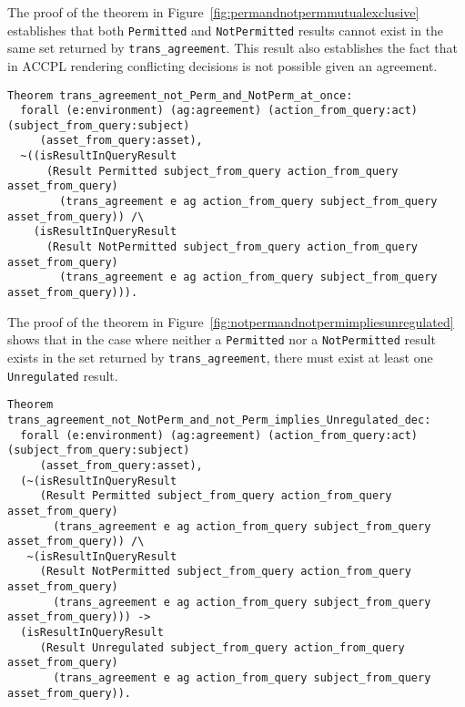 \documentclass[conference]{IEEEtran}
\newcommand{\syn}{\texttt}
\begin{document}
The proof of the theorem in
Figure~\ref{fig:permandnotpermmutualexclusive} establishes that both
\syn{Permitted} and \syn{NotPermitted} results cannot exist in the
same set returned by \syn{trans_agreement}. This result also
establishes the fact that in \ac{ACCPL} rendering conflicting
decisions is not possible given an agreement.

\lstset{language=Coq, captionpos=b}
\begin{figure*}
\begin{lstlisting}
Theorem trans_agreement_not_Perm_and_NotPerm_at_once:
  forall (e:environment) (ag:agreement) (action_from_query:act) (subject_from_query:subject)
     (asset_from_query:asset),
  ~((isResultInQueryResult 
      (Result Permitted subject_from_query action_from_query asset_from_query)
        (trans_agreement e ag action_from_query subject_from_query asset_from_query)) /\
    (isResultInQueryResult 
      (Result NotPermitted subject_from_query action_from_query asset_from_query)
        (trans_agreement e ag action_from_query subject_from_query asset_from_query))).
\end{lstlisting}
\caption{\syn{Permitted} and \syn{NotPermitted}: Mutually Exclusive}
\label{fig:permandnotpermmutualexclusive}
\end{figure*}

The proof of the theorem in
Figure~\ref{fig:notpermandnotpermimpliesunregulated} shows that in
the case where neither a \syn{Permitted} nor a \syn{NotPermitted}
result exists in the set returned by \syn{trans_agreement}, there must
exist at least one \syn{Unregulated} result.

\lstset{language=Coq, captionpos=b}
\begin{figure*}
\begin{lstlisting}
Theorem trans_agreement_not_NotPerm_and_not_Perm_implies_Unregulated_dec:
  forall (e:environment) (ag:agreement) (action_from_query:act) (subject_from_query:subject)
     (asset_from_query:asset),
  (~(isResultInQueryResult 
     (Result Permitted subject_from_query action_from_query asset_from_query)
       (trans_agreement e ag action_from_query subject_from_query asset_from_query)) /\
   ~(isResultInQueryResult 
     (Result NotPermitted subject_from_query action_from_query asset_from_query)
       (trans_agreement e ag action_from_query subject_from_query asset_from_query))) ->
  (isResultInQueryResult 
     (Result Unregulated subject_from_query action_from_query asset_from_query)
       (trans_agreement e ag action_from_query subject_from_query asset_from_query)).
\end{lstlisting}
\caption{(Not \syn{Permitted} and Not \syn{NotPermitted}) Implies \syn{Unregulated}}
\label{fig:notpermandnotpermimpliesunregulated}
\end{figure*}
\end{document}
